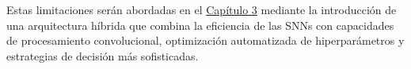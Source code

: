 Estas limitaciones serán abordadas en el \hyperref[chap:especificacion]{Capítulo 3} mediante la introducción de una arquitectura híbrida que combina la eficiencia de las SNNs con capacidades de procesamiento convolucional, optimización automatizada de hiperparámetros y estrategias de decisión más sofisticadas.

